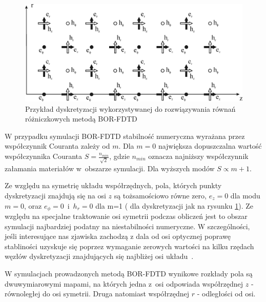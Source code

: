 \begin{figure}
	\includegraphics[width=\textwidth]{subart/fdtd/R5_TFSF.png}
	\caption{Przykład dyskretyzacji wykorzystywanej do rozwiązywania równań różniczkowych metodą BOR-FDTD \cite{antosiewicz2009wplyw}}
	\label{fig:bor-dysk}
\end{figure}
W przypadku symulacji BOR-FDTD stabilność numeryczna wyrażana przez współczynnik Couranta zależy od $m$. Dla $m=0$ największa dopuszczalna wartość współczynnika Couranta $S=\frac{n_{min}}{\sqrt{2}}$, gdzie $n_{min}$ oznacza najniższy współczynnik załamania materiałów w~obszarze symulacji. Dla wyższych modów $S \propto m+1$. 

Ze względu na symetrię układu współrzędnych, pola, których punkty dyskretyzacji znajdują się na osi $z$ są tożsamościowo równe zero, $e_z=0$ dla modu $m=0$, oraz $e_{\phi}=0$~i~$h_r=0$ dla m=1 ( dla dyskretyzacji jak na rysunku \ref{fig:bor-dysk}). Ze względu na specjalne traktowanie osi symetrii podczas obliczeń jest to obszar symulacji najbardziej podatny na niestabilności numeryczne. W szczególności, jeśli interesujące nas zjawiska zachodzą z dala od osi optycznej poprawę stabliności uzyskuje się poprzez wymaganie zerowych wartości na kilku rzędach węzłów dyskretyzacji znajdujących się najbliżej osi układu~\cite{OskooiRo10}.

W symulacjach prowadzonych metodą BOR-FDTD wynikowe rozkłady pola są dwuwymiarowymi mapami, na których jedna z~osi odpowiada współrzędnej $z$ - równoległej do osi symetrii. Druga natomiast współrzędnej $r$ - odległości od osi. 
